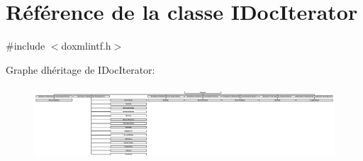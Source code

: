 \hypertarget{class_i_doc_iterator}{}\section{Référence de la classe I\+Doc\+Iterator}
\label{class_i_doc_iterator}


{\ttfamily \#include $<$doxmlintf.\+h$>$}

Graphe d\textquotesingle{}héritage de I\+Doc\+Iterator\+:\begin{figure}[H]
\begin{center}
\leavevmode
\includegraphics[height=2.723112cm]{class_i_doc_iterator}
\end{center}
\end{figure}
